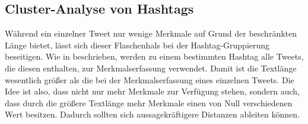 \subsection{Cluster-Analyse von Hashtags} \label{subsec:ClusterHashtags}
Während ein einzelner Tweet nur wenige Merkmale auf Grund der beschränkten Länge bietet, lässt sich dieser Flaschenhals bei der Hashtag-Gruppierung beseitigen. 
Wie in \cite{TsurLittman} beschrieben, werden zu einem bestimmten Hashtag alle Tweets, 
die diesen ent\-hal\-ten, zur Merkmalserfassung verwendet. Damit ist die Textlänge wesentlich größer als die bei der Merkmalserfassung eines einzelnen Tweets. Die Idee ist also, dass nicht nur mehr Merkmale zur Verfügung stehen, sondern auch, dass durch die größere Textlänge mehr Merkmale einen von Null verschiedenen Wert besitzen. Dadurch sollten sich aussagekräftigere Distanzen ableiten können.

